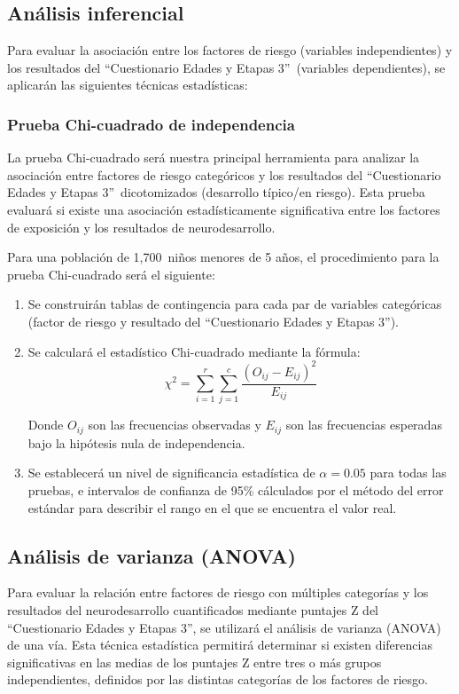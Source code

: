 \documentclass[11pt,letterpaper]{report}
\newcommand{\muestradeseada}{1,700}
\newcommand{\asq}{“Cuestionario Edades y Etapas 3”}
\begin{document}
\subsection{Análisis inferencial}
Para evaluar la asociación entre los factores de riesgo (variables
independientes) y los resultados del \asq\ (variables dependientes), se
aplicarán las siguientes técnicas estadísticas:

\subsubsection{Prueba Chi-cuadrado de independencia}
La prueba Chi-cuadrado será nuestra principal herramienta para analizar la
asociación entre factores de riesgo categóricos y los resultados del \asq\
dicotomizados (desarrollo típico/en riesgo). Esta prueba evaluará si existe una
asociación estadísticamente significativa entre los factores de exposición y
los resultados de neurodesarrollo.

Para una población de \muestradeseada\ niños menores de 5 años, el
procedimiento para la prueba Chi-cuadrado será el siguiente:

\begin{enumerate}
    \item Se construirán tablas de contingencia para cada par de variables
		categóricas (factor de riesgo y resultado del \asq).
    
    \item Se calculará el estadístico Chi-cuadrado mediante la fórmula:
    \[
    \chi^2 = \sum_{i=1}^r \sum_{j=1}^c \frac{(O_{ij} - E_{ij})^2}{E_{ij}}
    \]
    
    Donde \( O_{ij} \) son las frecuencias observadas y \( E_{ij} \) son las
	frecuencias esperadas bajo la hipótesis nula de independencia.
    
    \item Se establecerá un nivel de significancia estadística de $\alpha = 0.05$
		para todas las pruebas, e intervalos de confianza de 95\% cálculados
		por el método del error estándar para describir el rango en el que se
		encuentra el valor real.
\end{enumerate}

\subsection{Análisis de varianza (ANOVA)}
Para evaluar la relación entre factores de riesgo con múltiples categorías y
los resultados del neurodesarrollo cuantificados mediante puntajes Z del 
\asq, se utilizará el análisis de varianza (ANOVA) de una vía. Esta técnica
estadística permitirá determinar si existen diferencias significativas en las
medias de los puntajes Z entre tres o más grupos independientes, definidos por
las distintas categorías de los factores de riesgo.
\end{document}
